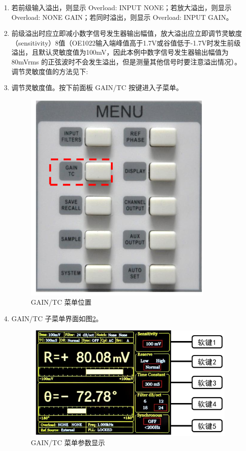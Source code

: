 \documentclass[11pt,a4paper]{ctexart}
\begin{document}
\begin{enumerate}[(1)]
		\item 若前级输入溢出，则显示 Overload: INPUT NONE；若放大溢出，则显示 Overload: NONE GAIN；若同时溢出，则显示 Overload: INPUT GAIN。
		
		\item 前级溢出时应立即减小数字信号发生器输出幅值，放大溢出应立即调节灵敏度（sensitivity）8值（OE1022输入端峰值高于1.7V或谷值低于-1.7V时发生前级溢出，且默认灵敏度值为100mV，因此本例中数字信号发生器输出幅值为 80mVrms 的正弦波时不会发生溢出，但是测量其他信号时要注意溢出情况）。调节灵敏度值的方法见下:
		
		\item 调节灵敏度值。按下前面板 GAIN/TC 按键进入子菜单。
		\begin{figure}[H]
			\centering
			\includegraphics[scale=0.5]{D1-14}
			\caption{GAIN/TC 菜单位置}\label{D1-14}
		\end{figure}
	
		\item GAIN/TC 子菜单界面如图\ref{D1-15}。
		\begin{figure}[H]
			\centering
			\includegraphics[scale=0.5]{D1-15}
			\caption{GAIN/TC 菜单参数显示}\label{D1-15}
		\end{figure}
		

\end{enumerate}
\end{document}
